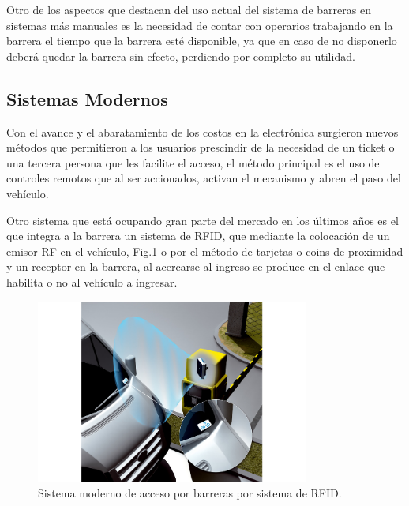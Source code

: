 Otro de los aspectos que destacan del uso actual del sistema de barreras en sistemas más manuales es la necesidad de
contar con  operarios trabajando en la barrera el tiempo que la barrera esté disponible, ya que en caso de no disponerlo
deberá quedar la barrera sin efecto, perdiendo por completo su utilidad.

\subsection{Sistemas Modernos}

Con el avance y el abaratamiento de los costos en la electrónica surgieron nuevos métodos que permitieron a los usuarios
prescindir de la necesidad de un ticket o una tercera persona que les facilite el acceso, el método principal es el uso
de controles remotos que al ser accionados, activan el mecanismo y abren el paso del vehículo.
 
Otro sistema que está ocupando gran parte del mercado en los últimos años es el que integra a la barrera un sistema de
RFID, que mediante la colocación de un emisor RF en el vehículo, Fig.\ref{fig:sistema-moderno} o por el método de tarjetas o coins de proximidad y un
receptor en la barrera, al acercarse al ingreso se produce en el enlace que habilita o no al vehículo a ingresar.

\begin{figure}
    \centering
    \includegraphics[width=0.8\textwidth]{imgs/sistema-control-acceso-barreras-rfid.jpg}
    \caption{Sistema moderno de acceso por barreras por sistema de RFID.}
    \label{fig:sistema-moderno}
\end{figure}

